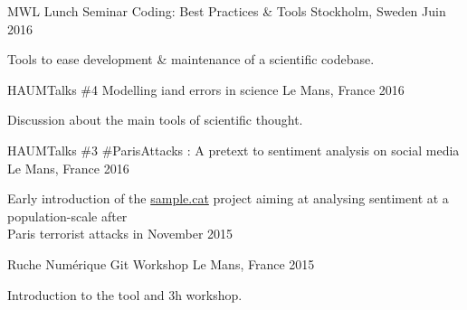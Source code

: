 

\begin{cventries}

  \cventry
    {MWL Lunch Seminar} %
		{Coding: Best Practices \& Tools} %
    {Stockholm, Sweden} %
    {Juin 2016} %
    {
      \begin{cvitems} %
			\item {Tools to ease development \& maintenance of a scientific codebase.}
      \end{cvitems}
    }

  \cventry
		{HAUMTalks \#4} %
    {Modelling iand errors in science} %
    {Le Mans, France} %
    {2016} %
    {
      \begin{cvitems} %
			\item {Discussion about the main tools of scientific thought.}
      \end{cvitems}
    }

  \cventry
		{HAUMTalks \#3} %
    {\#ParisAttacks : A pretext to sentiment analysis on social media} %
    {Le Mans, France} %
    {2016} %
    {
      \begin{cvitems} %
			\item {Early introduction of the \href{https://sample.cat}{sample.cat} project
				aiming at analysing sentiment at a population-scale after\\Paris terrorist attacks in November 2015}
      \end{cvitems}
    }

  \cventry
    {Ruche Numérique} %
    {Git Workshop} %
    {Le Mans, France} %
    {2015} %
    {
      \begin{cvitems} %
			\item {Introduction to the tool and 3h workshop.}
      \end{cvitems}
    }


\end{cventries}
